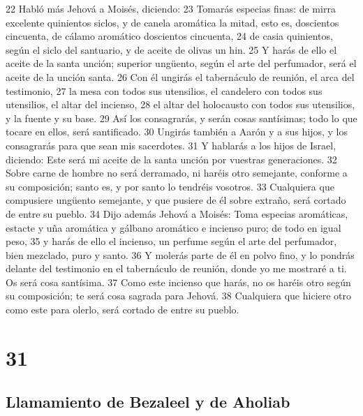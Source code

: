 22 Habló más Jehová a Moisés, diciendo:
23 Tomarás especias finas: de mirra excelente quinientos siclos,  y de canela aromática la mitad, esto es, doscientos cincuenta, de cálamo aromático doscientos cincuenta,
24 de casia quinientos, según el siclo del santuario, y de aceite de olivas un hin.
25 Y harás de ello el aceite de la santa unción; superior ungüento, según el arte del perfumador, será el aceite de la unción santa.
26 Con él ungirás el tabernáculo de reunión, el arca del testimonio,
27 la mesa con todos sus utensilios, el candelero con todos sus utensilios, el altar del incienso,
28 el altar del holocausto con todos sus utensilios, y la fuente y su base.
29 Así los consagrarás, y serán cosas santísimas; todo lo que tocare en ellos, será santificado.
30 Ungirás también a Aarón y a sus hijos, y los consagrarás para que sean mis sacerdotes.
31 Y hablarás a los hijos de Israel, diciendo: Este será mi aceite de la santa unción por vuestras generaciones.
32 Sobre carne de hombre no será derramado, ni haréis otro semejante, conforme a su composición; santo es, y por santo lo tendréis vosotros.
33 Cualquiera que compusiere ungüento semejante, y que pusiere de él sobre extraño, será cortado de entre su pueblo.
34 Dijo además Jehová a Moisés: Toma especias aromáticas, estacte y uña aromática y gálbano aromático e incienso puro; de todo en igual peso,
35 y harás de ello el incienso, un perfume según el arte del perfumador, bien mezclado, puro y santo.
36 Y molerás parte de él en polvo fino, y lo pondrás delante del testimonio en el tabernáculo de reunión, donde yo me mostraré a ti. Os será cosa santísima.
37 Como este incienso que harás, no os haréis otro según su composición; te será cosa sagrada para Jehová.
38 Cualquiera que hiciere otro como este para olerlo, será cortado de entre su pueblo.

\chapter{31}

\section{Llamamiento de Bezaleel y de Aholiab}

